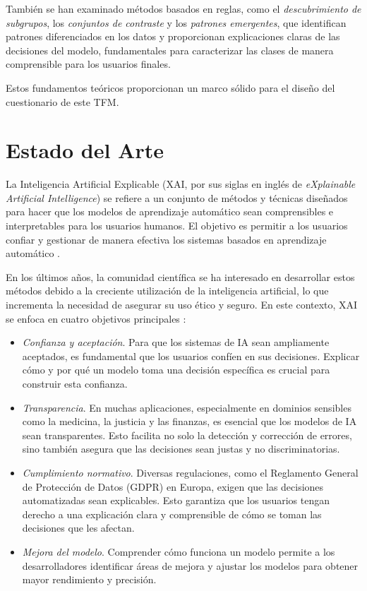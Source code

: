También se han examinado métodos basados en reglas, como el \textit{descubrimiento de subgrupos}, los \textit{conjuntos de contraste} y los \textit{patrones emergentes}, que identifican patrones diferenciados en los datos y proporcionan explicaciones claras de las decisiones del modelo, fundamentales para caracterizar las clases de manera comprensible para los usuarios finales.

Estos fundamentos teóricos proporcionan un marco sólido para el diseño del cuestionario de este TFM.

\chapter{Estado del Arte}

La Inteligencia Artificial Explicable (XAI, por sus siglas en inglés de \emph{eXplainable Artificial Intelligence}) se refiere a un conjunto de métodos y técnicas diseñados para hacer que los modelos de aprendizaje automático sean comprensibles e interpretables para los usuarios humanos. El objetivo es permitir a los usuarios confiar y gestionar de manera efectiva los sistemas basados en aprendizaje automático \cite{gunning2019xai}. 

En los últimos años, la comunidad científica se ha interesado en desarrollar estos métodos debido a la creciente utilización de la inteligencia artificial, lo que incrementa la necesidad de asegurar su uso ético y seguro. En este contexto, XAI se enfoca en cuatro objetivos principales \cite{curso-xai}:

\begin{itemize}
    \item \textit{Confianza y aceptación}. Para que los sistemas de IA sean ampliamente aceptados, es fundamental que los usuarios confíen en sus decisiones. Explicar cómo y por qué un modelo toma una decisión específica es crucial para construir esta confianza.
    
    \item \textit{Transparencia}. En muchas aplicaciones, especialmente en dominios sensibles como la medicina, la justicia y las finanzas, es esencial que los modelos de IA sean transparentes. Esto facilita no solo la detección y corrección de errores, sino también asegura que las decisiones sean justas y no discriminatorias.
    
    \item \textit{Cumplimiento normativo}. Diversas regulaciones, como el Reglamento General de Protección de Datos (GDPR) en Europa, exigen que las decisiones automatizadas sean explicables. Esto garantiza que los usuarios tengan derecho a una explicación clara y comprensible de cómo se toman las decisiones que les afectan.
    
    \item \textit{Mejora del modelo}. Comprender cómo funciona un modelo permite a los desarrolladores identificar áreas de mejora y ajustar los modelos para obtener mayor rendimiento y precisión.
\end{itemize}

